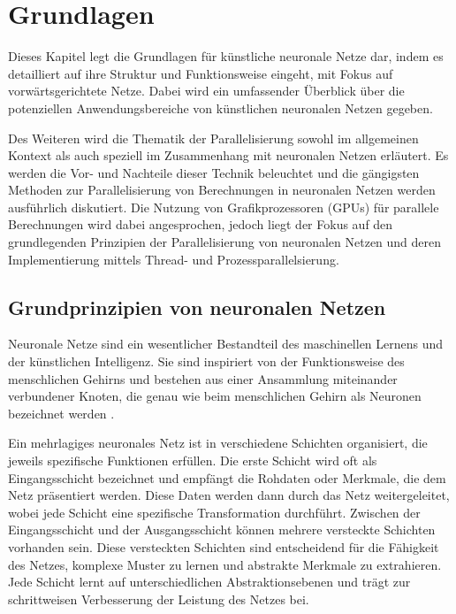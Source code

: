 \chapter{Grundlagen}
\label{ch:Grundlagen}

Dieses Kapitel legt die Grundlagen für künstliche neuronale Netze dar, indem es detailliert auf ihre Struktur und Funktionsweise eingeht, mit Fokus auf vorwärtsgerichtete Netze. Dabei wird ein umfassender Überblick über die potenziellen Anwendungsbereiche von künstlichen neuronalen Netzen gegeben.

Des Weiteren wird die Thematik der Parallelisierung sowohl im allgemeinen Kontext als auch speziell im Zusammenhang mit neuronalen Netzen erläutert. Es werden die Vor- und Nachteile dieser Technik beleuchtet und die gängigsten Methoden zur Parallelisierung von Berechnungen in neuronalen Netzen werden ausführlich diskutiert.
Die Nutzung von Grafikprozessoren (GPUs) für parallele Berechnungen wird dabei angesprochen, jedoch liegt der Fokus auf den grundlegenden Prinzipien der Parallelisierung von neuronalen Netzen und deren Implementierung mittels Thread- und Prozessparallelsierung.

\section{Grundprinzipien von neuronalen Netzen}
\label{sec:Grundlagen_Grundprinzipien_neuronale_Netze}
Neuronale Netze sind ein wesentlicher Bestandteil des maschinellen Lernens und der künstlichen Intelligenz. Sie sind inspiriert von der Funktionsweise des menschlichen Gehirns und bestehen aus einer Ansammlung miteinander verbundener Knoten, die genau wie beim menschlichen Gehirn als Neuronen bezeichnet werden \citep{Manuela_Kunstliche_Intelligenz}.

Ein mehrlagiges neuronales Netz ist in verschiedene Schichten organisiert, die jeweils spezifische Funktionen erfüllen. Die erste Schicht wird oft als Eingangsschicht bezeichnet und empfängt die Rohdaten oder Merkmale, die dem Netz präsentiert werden. Diese Daten werden dann durch das Netz weitergeleitet, wobei jede Schicht eine spezifische Transformation durchführt.
Zwischen der Eingangsschicht und der Ausgangsschicht können mehrere versteckte Schichten vorhanden sein. Diese versteckten Schichten sind entscheidend für die Fähigkeit des Netzes, komplexe Muster zu lernen und abstrakte Merkmale zu extrahieren. Jede Schicht lernt auf unterschiedlichen Abstraktionsebenen und trägt zur schrittweisen Verbesserung der Leistung des Netzes bei.

